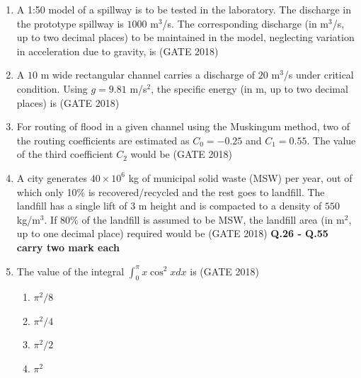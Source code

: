 \documentclass[journal,12pt,onecolumn]{IEEEtran}
\theoremstyle{remark}
\begin{document}
\begin{enumerate}
\item A 1:50 model of a spillway is to be tested in the laboratory. The discharge in the prototype spillway is $1000$ m$^3$/s. The corresponding discharge (in m$^3$/s, up to two decimal places) to be maintained in the model, neglecting variation in acceleration due to gravity, is \underline{\hspace{3cm}}
\hfill{(GATE 2018)}
\vspace{1cm}

\item A $10$ m wide rectangular channel carries a discharge of $20$ m$^3$/s under critical condition. Using $g = 9.81$ m/s$^2$, the specific energy (in m, up to two decimal places) is \underline{\hspace{3cm}}
\hfill{(GATE 2018)}
\vspace{1cm}

\item For routing of flood in a given channel using the Muskingum method, two of the routing coefficients are estimated as $C_0 = -0.25$ and $C_1 = 0.55$. The value of the third coefficient $C_2$ would be \underline{\hspace{3cm}}
\hfill{(GATE 2018)}
\vspace{1cm}

\item A city generates $40 \times 10^6$ kg of municipal solid waste (MSW) per year, out of which only 10\% is recovered/recycled and the rest goes to landfill. The landfill has a single lift of $3$ m height and is compacted to a density of $550$ kg/m$^3$. If 80\% of the landfill is assumed to be MSW, the landfill area (in m$^2$, up to one decimal place) required would be \underline{\hspace{3cm}}
\hfill{(GATE 2018)}
\vspace{1cm}
\newpage
\textbf{\large Q.26 - Q.55 carry two mark each}
\vspace{1cm}
\item The value of the integral $\int_{0}^{\pi} x \cos^2 x dx$ is
\hfill{(GATE 2018)}
\begin{multicols}{4}
\begin{enumerate}
    \item $\pi^2/8$
    \item $\pi^2/4$
    \item $\pi^2/2$
    \item $\pi^2$
\end{enumerate}
\end{multicols}
\vspace{1cm}


\end{enumerate}
\end{document}
